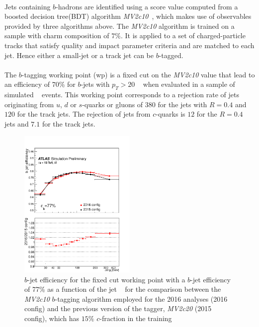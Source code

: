 \paragraph{}
Jets containing $b$-hadrons are identified using a score value computed from a boosted decision tree(BDT) algorithm \emph{MV2c10}~\cite{btaggingRun2, Aad:2015ydr}, which makes use of observables provided by three algorithms above. The \emph{MV2c10} algorithm is trained on a sample with charm composition of $7\%$. It is applied to a set of charged-particle tracks that satisfy quality and impact parameter criteria and are matched to each jet. Hence either a small-\R jet or a track jet can be $b$-tagged.

\paragraph{}
The $b$-tagging working point (wp) is a fixed cut on the \emph{MV2c10} value that lead to an efficiency of 70\% for $b$-jets with $p_T > 20$ \GeV~ when evaluated in a sample of simulated \ttbar~ events. This working point corresponds to a rejection rate of jets originating from $u$, $d$ or $s$-quarks or gluons of $380$ for the jets with $R=0.4$ and $120$ for the track jets. The rejection of jets from $c$-quarks is $12$ for the $R=0.4$ jets and $7.1$ for the track jets.

\begin{figure}[htbp!]
  \centering
  \captionsetup{justification=centering}
  \includegraphics[width=0.5\textwidth]{figures/object/b_eff_pt}
   \caption{$b$-jet efficiency for the fixed cut working point with a $b$-jet efficiency of 77\% as a function of the jet \pt~ for the comparison between the \emph{MV2c10} $b$-tagging algorithm employed for the 2016 analyses (2016 config) and the previous version of the tagger, \emph{MV2c20} (2015 config), which has $15\%$ $c$-fraction in the training}
  \label{fig:obj_b_eff}
\end{figure}

